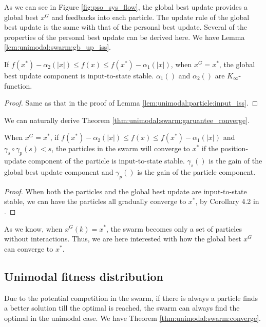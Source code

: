 As we can see in Figure \ref{fig:pso_sys_flow}, the global best update provides a global best $ x^{G} $ and feedbacks into each particle.
The update rule of the global best update is the same with that of the personal best update.
Several of the properties of the personal best update can be derived here.
We have Lemma \ref{lem:unimodal:swarm:gb_up_iss}.

\begin{mylem}
\label{lem:unimodal:swarm:gb_up_iss}
If $ f(x^{*}) - \alpha_{2} ( |x| ) \leq  f(x) \leq f(x^{*}) - \alpha_{1} ( |x| ) $, when $ x^{G} = x^{*} $, the global best update component is input-to-state stable.
$ \alpha_{1} () $ and $ \alpha_{2} () $ are $ K_{\infty} $-function.
\begin{proof}
Same as that in the proof of Lemma \ref{lem:unimodal:particle:input_iss}.
\end{proof}
\end{mylem}

We can naturally derive Theorem \ref{thm:unimodal:swarm:garuantee_converge}.

\begin{mythm}
\label{thm:unimodal:swarm:garuantee_converge}
When $ x^{G} = x^{*} $,  if $ f(x^{*}) - \alpha_{2} ( |x| ) \leq  f(x) \leq f(x^{*}) - \alpha_{1} ( |x| ) $ and $ \gamma_{s} \circ \gamma_{p} (s)  < s $, the particles in the swarm will converge to $ x^{*} $ if the position-update component of the particle is input-to-state stable.
$ \gamma_{s} () $ is the gain of the global best update component and $ \gamma_{p} () $ is the gain of the particle component.
\begin{proof}
When both the particles and the global best update are input-to-state stable, we can have the particles all gradually converge to $ x^{*} $, by Corollary 4.2 in \cite{Jiang2001857}.
\end{proof}
\end{mythm}

As we know, when $ x^{G}(k) = x^{*} $, the swarm becomes only a set of particles without interactions.
Thus, we are here interested with how the global best $ x^{G} $ can converge to $ x^{*} $.

\subsection{Unimodal fitness distribution}

Due to the potential competition in the swarm, if there is always a particle finds a better solution till the optimal is reached, the swarm can always find the optimal in the unimodal case.
We have Theorem \ref{thm:unimodal:swarm:converge}.

